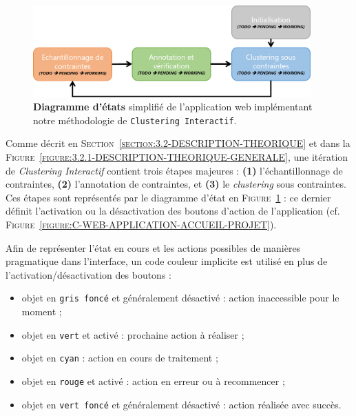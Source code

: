 		\begin{figure}[H]
			\centering
			\includegraphics[width=0.95\textwidth]{figures/interactive-clustering-application-diagramme-etats}
			\caption{
				\textbf{Diagramme d'états} simplifié de l'application web implémentant notre méthodologie de \texttt{Clustering Interactif}.
			}
			\label{figure:C-WEB-APPLICATION-DIAGRAMME-ETATS}
		\end{figure}
		
		Comme décrit en \textsc{Section~\ref{section:3.2-DESCRIPTION-THEORIQUE}} et dans la \textsc{Figure~\ref{figure:3.2.1-DESCRIPTION-THEORIQUE-GENERALE}}, une itération de \textit{Clustering Interactif} contient trois étapes majeures : \textbf{(1)} l'échantillonnage de contraintes, \textbf{(2)} l'annotation de contraintes, et \textbf{(3)} le \textit{clustering} sous contraintes.
		Ces étapes sont représentés par le diagramme d'état en \textsc{Figure~\ref{figure:C-WEB-APPLICATION-DIAGRAMME-ETATS}} : ce dernier définit l'activation ou la désactivation des boutons d'action de l'application (cf. \textsc{Figure~\ref{figure:C-WEB-APPLICATION-ACCUEIL-PROJET}}).
		
		Afin de représenter l'état en cours et les actions possibles de manières pragmatique dans l'interface, un code couleur implicite est utilisé en plus de l'activation/désactivation des boutons :
		\begin{itemize}
			\item objet en \texttt{gris foncé} et généralement désactivé : action inaccessible pour le moment ;
			\item objet en \texttt{vert} et activé : prochaine action à réaliser ;
			\item objet en \texttt{cyan} : action en cours de traitement ;
			\item objet en \texttt{rouge} et activé : action en erreur ou à recommencer ;
			\item objet en \texttt{vert foncé} et généralement désactivé : action réalisée avec succès.
		\end{itemize}
		
